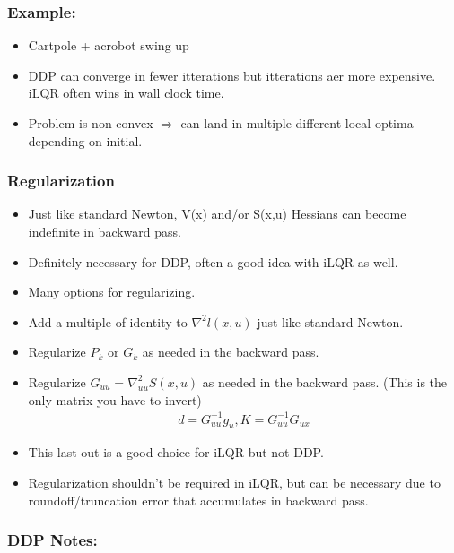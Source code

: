 \subsubsection{Example:}

\begin{itemize}
    \item Cartpole + acrobot swing up
    \item DDP can converge in fewer itterations but itterations aer more expensive. iLQR often wins in wall clock time.
    \item Problem is non-convex $\Rightarrow$ can land in multiple different local optima depending on initial.
\end{itemize}

\subsubsection{Regularization}

\begin{itemize}
    \item Just like standard Newton, V(x) and/or S(x,u) Hessians can become indefinite in backward pass.
    \item Definitely necessary for DDP, often a good idea with iLQR as well.
    \item Many options for regularizing.
    \item Add a multiple of identity to $\nabla^2 l(x,u)$ just like standard Newton.
    \item Regularize $P_k$ or $G_k$ as needed in the backward pass.
    \item Regularize $G_{uu} = \nabla_{uu}^2 S(x,u)$ as needed in the backward pass. (This is the only matrix you have to invert)
    \begin{align}
        d = G_{uu}^{-1} g_u, K = G_{uu}^{-1} G_{ux}
    \end{align}
    \item This last out is a good choice for iLQR but not DDP.
    \item Regularization shouldn't be required in iLQR, but can be necessary due to roundoff/truncation error that accumulates in backward pass.
\end{itemize}

\subsubsection{DDP Notes:}

